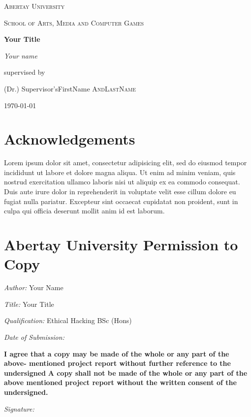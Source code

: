 \documentclass[12pt,a4paper]{article}
\begin{document}
	\begin{titlepage}
		\centering
		{\scshape\LARGE Abertay University \par}
		\vspace{1cm}
		{\scshape School of Arts, Media and Computer Games \par}
		\vspace{1.5cm}
		{\Large\bfseries Your Title\par}
		\vspace{4cm}
		{\Large\itshape Your name\par}
		\vfill
		supervised by\par
		(Dr.) Supervisor'sFirstName \textsc{AndLastName}
		\vfill
		{\large \today\par}
		\end{titlepage}
	\section{Acknowledgements}
		Lorem ipsum dolor sit amet, consectetur adipisicing elit, sed do eiusmod tempor incididunt ut labore et dolore magna aliqua. Ut enim ad minim veniam, quis nostrud exercitation ullamco laboris nisi ut aliquip ex ea commodo consequat. Duis aute irure dolor in reprehenderit in voluptate velit esse cillum dolore eu fugiat nulla pariatur. Excepteur sint occaecat cupidatat non proident, sunt in culpa qui officia deserunt mollit anim id est laborum.
		\clearpage
	\section{Abertay University Permission to Copy}
		\begingroup
		\setlength{\parskip}{2.5em}
		\setlength{\parindent}{0em}

		\textit{Author:} Your Name

		\textit{Title:} Your Title

		\textit{Qualification:} Ethical Hacking BSc (Hons)

		\textit{Date of Submission:}

		\textbf{I agree that a copy may be made of the whole or any part of the above- mentioned project report without further reference to the undersigned}
		\textbf{A copy shall not be made of the whole or any part of the above mentioned project report without the written consent of the undersigned.}

		\textit{Signature:}\\\\\\
\end{document}
